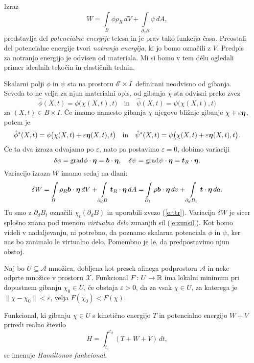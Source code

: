 Izraz
\begin{equation*}
	W = \int\limits_{B}\phi\rho_R\, dV + \int\limits_{\partial_d B}\psi\, dA,
\end{equation*}
predstavlja del \emph{potencialne energije} telesa in je prav tako funkcija časa.
Preostali del potencialne energije tvori \emph{notranja energija}, ki jo bomo označili z $V$.
Predpis za notranjo energijo je odvisen od materiala. Mi si bomo v tem délu ogledali primer
idealnih tekočin in elastičnih trdnin. 

Skalarni polji $\phi$ in $\psi$ sta na prostoru $\mathscr E\times I$ definirani neodvisno od gibanja.
Seveda to ne velja za njun materialni opis, od gibanja $\chi$ sta odvisni preko zvez
\[ \hat{\phi}(X,t)=\phi\big(\chi(X,t),t\big)\quad\textrm{in}\quad\hat{\psi}(X,t)=\psi\big(\chi(X,t),t\big) \]
za $(X,t)\in B\times I$.
Če imamo namesto gibanja $\chi$ njegovo bližnje gibanje $\chi+\varepsilon\boldsymbol \eta$, potem je
\[
	\hat{\phi}^*(X,t)=\phi\big(\chi(X,t)+\varepsilon\boldsymbol \eta(X,t),t\big)\quad\textrm{in}
	\quad\hat{\psi}^*(X,t)=\psi\big(\chi(X,t)+\varepsilon\boldsymbol \eta(X,t),t\big).
\]
Če ta dva izraza odvajamo po $\varepsilon$, nato pa postavimo $\varepsilon=0$, dobimo variaciji
\[
	\delta\phi=\mathrm{grad}\phi\cdot\boldsymbol \eta=\boldsymbol b\cdot\boldsymbol \eta,\quad
	\delta\psi=\mathrm{grad}\psi\cdot\boldsymbol \eta=\boldsymbol t_R\cdot\boldsymbol \eta.
\]
Variacijo izraza $W$ imamo sedaj na dlani:
\[
	\delta W = \int\limits_{B}\rho_R\boldsymbol b\cdot\boldsymbol \eta\, dV + \int\limits_{\partial_d B}\boldsymbol t_R\cdot\boldsymbol \eta\, dA=
	\int\limits_{B_t}\rho\boldsymbol b\cdot\boldsymbol \eta\, dv + \int\limits_{\partial_d B_t}\boldsymbol t\cdot\boldsymbol \eta\, da.
\]
Tu smo z $\partial_d B_t$ označili $\chi_t(\partial_d B)$ in uporabili zvezo (\ref{e:ttr}).
Variacija $\delta W$ je sicer splošno znana
pod imenom \emph{virtualno delo} zunanjih sil (\ref{e:zunsil}). Kot bomo videli v nadaljevanju,
ni potrebno, da poznamo skalarna potenciala $\phi$ in $\psi$, ker nas bo zanimalo le virtualno delo.
Pomembno je le, da predpostavimo njun obstoj.

\begin{definicija}
	Naj bo $U\subseteq\mathcal{A}$ množica, dobljena kot presek afinega podprostora $\mathcal{A}$ in
	neke odprte množice v prostoru $\mathcal{X}$.
	Funkcional $F\colon U\to\mathbb R$ ima lokalni minimum pri dopustnem gibanju $\chi_{0}\in U$, če obstaja $\varepsilon >0$,
	da za vsak $\chi\in U$, za katerega je $\|\chi-\chi_{0}\|<\varepsilon$, velja $F(\chi_{0})<F(\chi)$.
\end{definicija}

\begin{definicija}
	Funkcional, ki gibanju $\chi\in U$ s kinetično energijo $T$ in potencialno
	energijo $W+V$ priredi realno število
	\[
		H=\int_{t_1}^{t_2}(T+W+V)\,dt,
	\]
	se imenuje \emph{Hamiltonov funkcional}.
\end{definicija}

